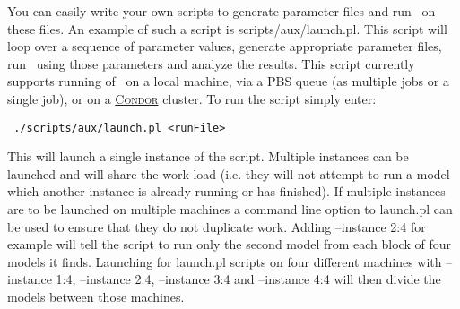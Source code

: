 You can easily write your own scripts to generate parameter files and run \glc\ on these files. An example of such a script is {\normalfont \ttfamily scripts/aux/launch.pl}. This script will loop over a sequence of parameter values, generate appropriate parameter files, run \glc\ using those parameters and analyze the results. This script currently supports running of \glc\ on a local machine, via a PBS queue (as multiple jobs or a single job), or on a \href{http://www.cs.wisc.edu/condor/}{{\normalfont \scshape Condor}} cluster. To run the script simply enter:
\begin{verbatim}
 ./scripts/aux/launch.pl <runFile>
\end{verbatim}
This will launch a single instance of the script. Multiple instances can be launched and will share the work load (i.e. they will not attempt to run a model which another instance is already running or has finished). If multiple instances are to be launched on multiple machines a command line option to {\normalfont \ttfamily launch.pl} can be used to ensure that they do not duplicate work. Adding {\normalfont \ttfamily --instance 2:4} for example will tell the script to run only the second model from each block of four models it finds. Launching for {\normalfont \ttfamily launch.pl} scripts on four different machines with {\normalfont \ttfamily --instance 1:4}, {\normalfont \ttfamily --instance 2:4}, {\normalfont \ttfamily --instance 3:4} and {\normalfont \ttfamily --instance 4:4} will then divide the models between those machines.

